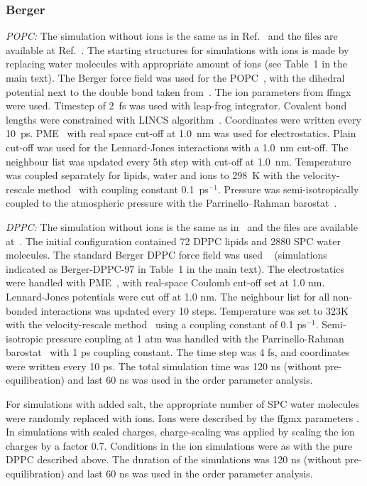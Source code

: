 \documentclass[twoside,twocolumn,9pt]{article}
\begin{document}
\subsubsection{Berger}
{\it POPC:} The simulation without ions is the same as in Ref.~ and the files are available at Ref.~. 
The starting structures for simulations with ions is made by replacing water molecules with appropriate amount of ions (see Table~1 in the main text).
The Berger force field was used for the POPC~\cite{berger97}, with the dihedral potential next to the double bond 
taken from~\cite{bachar04}. The ion parameters from ffmgx~\cite{straatsma88} were used.
Timestep of 2~fs was used with leap-frog integrator. Covalent bond lengths were constrained with LINCS algorithm~\cite{hess97,hess07}. 
Coordinates were written every 10~ps. PME~\cite{darden93,essman95} with real space cut-off at 1.0~nm was used 
for electrostatics. Plain cut-off was used for the Lennard-Jones interactions with a 1.0~nm cut-off.
The neighbour list was updated every 5th step with cut-off at 1.0~nm. Temperature was coupled separately
for lipids, water and ions to 298~K with the velocity-rescale method~\cite{bussi07} with coupling constant 0.1~ps$^{-1}$.
Pressure was semi-isotropically coupled to the atmospheric pressure with the Parrinello--Rahman barostat~\cite{parrinello81}.

{\it DPPC:} The simulation without ions is the same as in~\cite{botan15} and the files are available at~\cite{bergerDPPCfiles}.
The initial configuration contained 72 DPPC lipids and 2880 SPC water molecules.
The standard Berger DPPC force field was used ~\cite{berger97} (simulations indicated as Berger-DPPC-97 in Table~1 in the main text). 
The electrostatics were handled with PME~\cite{darden93,essman95}, with real-space Coulomb cut-off set at 1.0 nm. Lennard-Jones potentials were cut off at 1.0 nm. The neighbour list for all non-bonded interactions was updated every 10 steps. 
Temperature was set to 323K with the velocity-rescale method~\cite{bussi07} using a coupling constant of 0.1 ps$^{-1}$.  Semi-isotropic pressure coupling at 1 atm was handled with the Parrinello-Rahman barostat~\cite{parrinello81} with 1 ps coupling constant. The time step was 4 fs, and coordinates were written every 10 ps. The total simulation time was 120 ns (without pre-equilibration) and last 60 ns was used in the order parameter analysis. 

For simulations with added salt, the appropriate number of SPC water molecules were randomly replaced with ions. Ions were described by the ffgmx parameters \cite{straatsma88}. In simulations with scaled charges, charge-scaling was applied by scaling the ion charges  by a factor 0.7. Conditions in the ion simulations were as with the pure DPPC described above. The duration of the simulations was 120 ns (without pre-equilibration) and last 60 ns was used in the order parameter analysis.
\end{document}
